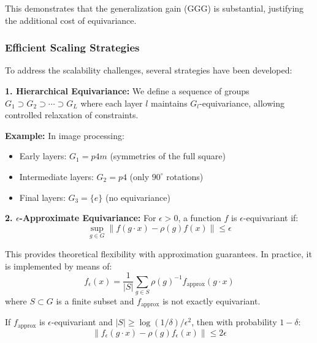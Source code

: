 This demonstrates that the generalization gain (GGG) is substantial, justifying the additional cost of equivariance.

\subsubsection{Efficient Scaling Strategies}

To address the scalability challenges, several strategies have been developed:

\textbf{1. Hierarchical Equivariance:} We define a sequence of groups $G_1 \supset G_2 \supset \cdots \supset G_L$ where each layer $l$ maintains $G_l$-equivariance, allowing controlled relaxation of constraints.

\textbf{Example:} In image processing:
\begin{itemize}
\item Early layers: $G_1 = p4m$ (symmetries of the full square)
\item Intermediate layers: $G_2 = p4$ (only $90^\circ$ rotations)
\item Final layers: $G_3 = \{e\}$ (no equivariance)
\end{itemize}

\textbf{2. $\epsilon$-Approximate Equivariance:} For $\epsilon > 0$, a function $f$ is $\epsilon$-equivariant if:
\begin{equation}
\sup_{g \in G} \|f(g \cdot x) - \rho(g)f(x)\| \leq \epsilon
\end{equation}

This provides theoretical flexibility with approximation guarantees. In practice, it is implemented by means of:
\begin{equation}
f_\epsilon(x) = \frac{1}{|S|} \sum_{g \in S} \rho(g)^{-1} f_{\text{approx}}(g \cdot x)
\end{equation}
where $S \subset G$ is a finite subset and $f_{\text{approx}}$ is not exactly equivariant.

\begin{proposition}
If $f_{\text{approx}}$ is $\epsilon$-equivariant and $|S| \geq \log(1/\delta) / \epsilon^2$, then with probability $1 - \delta$:
\begin{equation}
\|f_\epsilon(g \cdot x) - \rho(g) f_\epsilon(x)\| \leq 2\epsilon
\end{equation}
\end{proposition}

